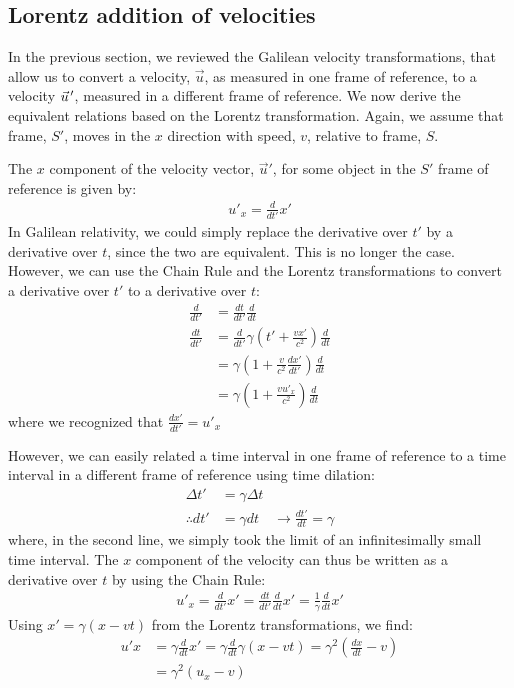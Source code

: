 \subsection{Lorentz addition of velocities}
In the previous section, we reviewed the Galilean velocity transformations, that allow us to convert a velocity, $\vec u$, as measured in one frame of reference, to a velocity $\pvec u'$, measured in a different frame of reference. We now derive the equivalent relations based on the Lorentz transformation. Again, we assume that frame, $S'$, moves in the $x$ direction with speed, $v$, relative to frame, $S$. 

The $x$ component of the velocity vector, $\vec u'$, for some object in the $S'$ frame of reference is given by:
\begin{align*}
u'_x = \frac{d}{dt'} x'
\end{align*}
In Galilean relativity, we could simply replace the derivative over $t'$ by a derivative over $t$, since the two are equivalent. This is no longer the case. However, we can use the Chain Rule and the Lorentz transformations to convert a derivative over $t'$ to a derivative over $t$:
\begin{align*}
\frac{d}{dt'} &= \frac{dt}{dt'}\frac{d}{dt}\\
\frac{dt}{dt'} &= \frac{d}{dt'} \gamma\left(t'+\frac{vx'}{c^2} \right)\frac{d}{dt}\\
&=\gamma \left(1+\frac{v}{c^2}\frac{dx'}{dt'}\right)\frac{d}{dt}\\
&=\gamma \left(1+\frac{vu'_x}{c^2}\right)\frac{d}{dt}
\end{align*}
where we recognized that $\frac{dx'}{dt'}=u'_x$


 However, we can easily related a time interval in one frame of reference to a time interval in a different frame of reference using time dilation:
\begin{align*}
\Delta t' &= \gamma \Delta t\\
\therefore dt' &= \gamma dt \quad \to \frac{dt'}{dt}=\gamma
\end{align*}
where, in the second line, we simply took the limit of an infinitesimally small time interval. The $x$ component of the velocity can thus be written as a derivative over $t$ by using the Chain Rule:
\begin{align*}
u'_x = \frac{d}{dt'} x' = \frac{dt}{dt'}\frac{d}{dt} x'=\frac{1}{\gamma}\frac{d}{dt} x'
\end{align*}
Using $x'=\gamma (x-vt)$ from the Lorentz transformations, we find:
\begin{align*}
u'x&=\gamma\frac{d}{dt} x'=\gamma\frac{d}{dt} \gamma (x-vt)=\gamma^2 (\frac{dx}{dt}-v)\\
&=\gamma^2 (u_x-v)
\end{align*}

